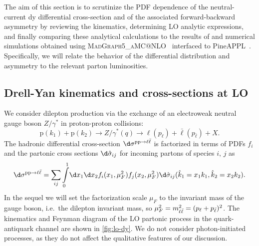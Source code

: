 
The aim of this  section is to scrutinize the PDF dependence of the
neutral-current \acrlong{dy} differential cross-section and of the associated
forward-backward asymmetry by
reviewing the \lo kinematics, determining LO analytic expressions, and finally
comparing these analytical calculations to the results of \lo and \nlo 
numerical simulations obtained  using \textsc{\small
MadGraph5\_aMC@NLO}~\cite{Alwall:2014hca} interfaced to {\sc\small
PineAPPL}~\cite{Carrazza:2020gss,christopher_schwan_2022_7023438}.
%
Specifically, we will relate the behavior of the differential
distribution and asymmetry to the relevant parton luminosities.

\subsection{Drell-Yan kinematics and cross-sections at LO}
\label{sec:dylo}

We consider dilepton production via the exchange of an electroweak
neutral gauge boson $Z/\gamma^*$
in proton-proton collisions:
\begin{equation}
  \label{eq:DYprocess}
  \mathrm{p}(k_1) + \mathrm{p}(k_2) \to Z/\gamma^*(q) \to \ell(p_{\ell}) + \bar{\ell}(p_{\bar{\ell}}) + X \text{.}
\end{equation}
The hadronic differential cross-section $\d\sigma^{\mathrm{p}\mathrm{p}\to\llb}$  is factorized in
terms of PDFs $f_i$ and the partonic cross sections
$\d\hat\sigma_{ij}$ for incoming partons of species $i,\,j$ as
\begin{equation}
  \d\sigma^{\mathrm{p}\mathrm{p}\to\llb} = \sum_{ij} \int\limits_0^1\!\d x_1 \d
  x_2 f_i(x_1,\mu_F^2) f_j(x_2,\mu_F^2) \d\hat\sigma_{ij}(\hat k_1 = x_1
  k_1, \hat k_2 = x_2 k_2).
  \label{eq:factorization}
\end{equation}
In the sequel we will set the  factorization scale $\mu_F$ to the
invariant mass of the gauge boson, i.e.\ the dilepton
invariant mass, so $\mu^2_F = m_{\ell\bar{\ell}}^2=(p_\ell + p_{\bar{\ell}})^2$.
%
The kinematics and Feynman diagram of the LO partonic process
in the quark-antiquark channel are shown in \cref{fig:lo-dy}.
We do not consider photon-initiated processes, as they do not affect
the qualitative features of our discussion.



